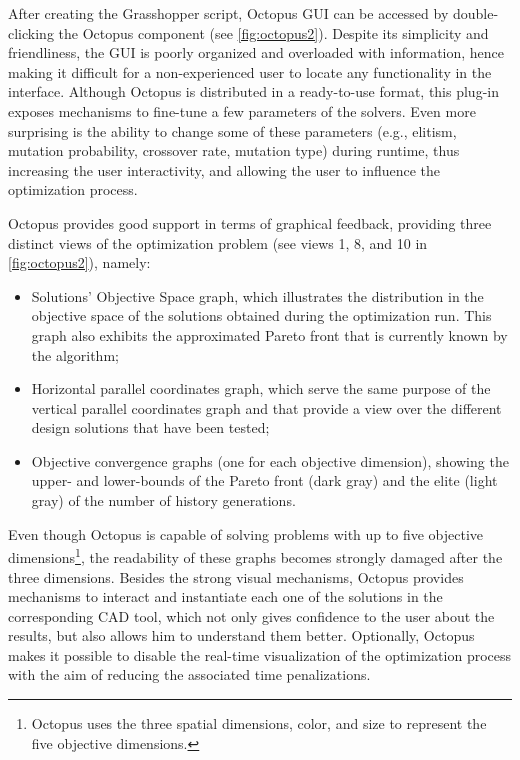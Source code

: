 	After creating the Grasshopper script, Octopus \ac{GUI} can be accessed by double-clicking the Octopus component (see \cref{fig:octopus2}). Despite its simplicity and friendliness, the \ac{GUI} is poorly organized and overloaded with information, hence making it difficult for a non-experienced user to locate any functionality in the interface. Although Octopus is distributed in a ready-to-use format, this plug-in exposes mechanisms to fine-tune a few parameters of the solvers. Even more surprising is the ability to change some of these parameters (e.g., elitism, mutation probability, crossover rate, mutation type) during runtime, thus increasing the user interactivity, and allowing the user to influence the optimization process.
	
	Octopus provides good support in terms of graphical feedback, providing three distinct views of the optimization problem (see views 1, 8, and 10 in \cref{fig:octopus2}), namely:
	\begin{itemize}
		\item Solutions' Objective Space graph, which illustrates the distribution in the objective space of the solutions obtained during the optimization run. This graph also exhibits the approximated Pareto front that is currently known by the algorithm;
		\item Horizontal parallel coordinates graph, which serve the same purpose of the vertical parallel coordinates graph and that provide a view over the different design solutions that have been tested;
		\item Objective convergence graphs (one for each objective dimension), showing the upper- and lower-bounds of the Pareto front (dark gray) and the elite (light gray) of the number of history generations.
	\end{itemize} 
	
	Even though Octopus is capable of solving problems with up to five objective dimensions\footnote{Octopus uses the three spatial dimensions, color, and size to represent the five objective dimensions.}, the readability of these graphs becomes strongly damaged after the three dimensions. Besides the strong visual mechanisms, Octopus provides mechanisms to interact and instantiate each one of the solutions in the corresponding \ac{CAD} tool, which not only gives confidence to the user about the results, but also allows him to understand them better. Optionally, Octopus makes it possible to disable the real-time visualization of the optimization process with the aim of reducing the associated time penalizations.
	
